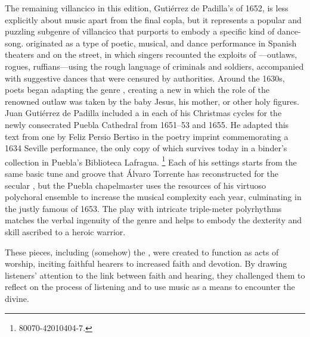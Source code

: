 The remaining villancico in this edition, Gutiérrez de Padilla's 
of 1652, is less explicitly about music apart from the final copla, but it
represents a popular and puzzling subgenre of villancico that purports to
embody a specific kind of dance-song.%
   \Autocite[Recording,][]{Padilla:1652ChristmasCD} 
 originated as a type of poetic, musical, and dance performance
in Spanish theaters and on the street, in which singers recounted the exploits
of ---outlaws, rogues, ruffians---using the rough language of
criminals and soldiers, accompanied with suggestive dances that were censured
by authorities.%
    \Autocite{Torrente:Jacara}
Around the 1630s, poets began adapting the genre , creating
a new  in which the role of the renowned outlaw
was taken by the baby Jesus, his mother, or other holy figures.
Juan Gutiérrez de Padilla included a  in each of his Christmas
cycles for the newly consecrated Puebla Cathedral from 1651--53 and 1655.
He adapted this text from one by Feliz Persio Bertiso in the poetry imprint
commemorating a 1634 Seville performance, the only copy of which survives
today in a binder's collection in Puebla's Biblioteca Lafragua.%
    \footnote{\signature{MEX-Plf}{80070-42010404-7}.}
Each of his settings starts from the same basic tune and groove that Álvaro
Torrente has reconstructed for the secular , but the Puebla
chapelmaster uses the resources of his virtuoso polychoral ensemble to
increase the musical complexity each year, culminating in the justly famous
 of 1653.
The play with intricate triple-meter polyrhythms matches the verbal ingenuity
of the genre and helps to embody the dexterity and skill ascribed to a 
heroic warrior.

These pieces, including (somehow) the , were created to function
as acts of worship, inciting faithful hearers to increased faith and devotion.
By drawing listeners' attention to the link between faith and hearing, they
challenged them to reflect on the process of listening and to use music as a
means to encounter the divine.

\endinput


